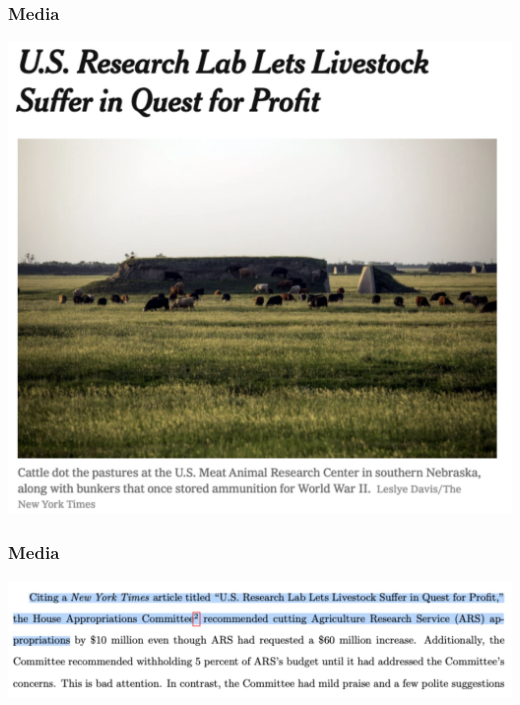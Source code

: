 \documentclass[aspectratio=169]{beamer}
\theoremstyle{principle}
\begin{document}
\begin{frame}
\begin{columns}
\end{columns}

\end{frame}

\begin{frame}
\frametitle{Media}
    \begin{center}
     \includegraphics[scale=0.33]{media_example.png}
     \end{center}
\end{frame}

\begin{frame}
\frametitle{Media}
    \begin{center}
     \includegraphics[scale=0.45]{media_consequences.png}
     \end{center}
\end{frame}
\end{document}
